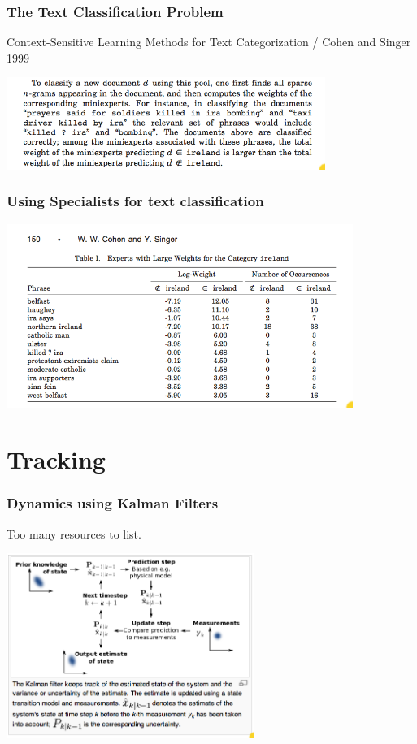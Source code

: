 \documentclass{beamer}
\begin{document}
\begin{frame}
\frametitle{The Text Classification Problem}
\begin{normalsize}
Context-Sensitive Learning Methods for Text Categorization / Cohen and
Singer 1999
\end{normalsize}
\begin{center}
\includegraphics[height=3cm]{figures/TextClassification1.png}
\end{center}
\end{frame}

\begin{frame}
\frametitle{Using Specialists for text classification}
\begin{center}
\includegraphics[height=6cm]{figures/TextClassification2.png}
\end{center}
\end{frame}

\section{Tracking}
\begin{frame}
\frametitle{Dynamics using Kalman Filters}
Too many resources to list.
\begin{center}
\includegraphics[height=6cm]{figures/KalmanFilter.png}
\end{center}
\end{frame}
\end{document}

